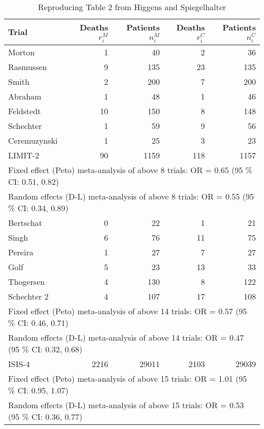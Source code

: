 \begin{table*}[b]
\centering
\begin{tabular}{lrrrr}
  \hline
Trial & Deaths $r_i^M$ & Patients $n_i^M$ & Deaths $r_i^C$ & Patients $n_i^C$ \\ 
  \hline
Morton &   1 &  40 &   2 &  36 \\ 
  Rasmussen &   9 & 135 &  23 & 135 \\ 
  Smith &   2 & 200 &   7 & 200 \\ 
  Abraham &   1 &  48 &   1 &  46 \\ 
  Feldstedt &  10 & 150 &   8 & 148 \\ 
  Schechter &   1 &  59 &   9 &  56 \\ 
  Ceremuzynski &   1 &  25 &   3 &  23 \\ 
  LIMIT-2 &  90 & 1159 & 118 & 1157 \\ 
   \hline
 \multicolumn{5}{l}{Fixed effect (Peto) meta-analysis of above 8 trials: OR = 0.65 (95 \% CI: 0.51, 0.82) } \\ 
 \multicolumn{5}{l}{Random effects (D-L) meta-analysis of above 8 trials: OR = 0.55 (95 \% CI: 0.34, 0.89) } \\ 
   \hline
Bertschat &   0 &  22 &   1 &  21 \\ 
  Singh &   6 &  76 &  11 &  75 \\ 
  Pereira &   1 &  27 &   7 &  27 \\ 
  Golf &   5 &  23 &  13 &  33 \\ 
  Thogersen &   4 & 130 &   8 & 122 \\ 
  Schechter 2 &   4 & 107 &  17 & 108 \\ 
   \hline
 \multicolumn{5}{l}{Fixed effect (Peto) meta-analysis of above 14 trials: OR = 0.57 (95 \% CI: 0.46, 0.71) } \\ 
 \multicolumn{5}{l}{Random effects (D-L) meta-analysis of above 14 trials: OR = 0.47 (95 \% CI: 0.32, 0.68) } \\ 
   \hline
ISIS-4 & 2216 & 29011 & 2103 & 29039 \\ 
   \hline
 \multicolumn{5}{l}{Fixed effect (Peto) meta-analysis of above 15 trials: OR = 1.01 (95 \% CI: 0.95, 1.07) } \\ 
 \multicolumn{5}{l}{Random effects (D-L) meta-analysis of above 15 trials: OR = 0.53 (95 \% CI: 0.36, 0.77) } \\ 
 \end{tabular}
\caption{Reproducing Table 2 from Higgens and Spiegelhalter}
\label{tab:Table2}
\end{table*}

